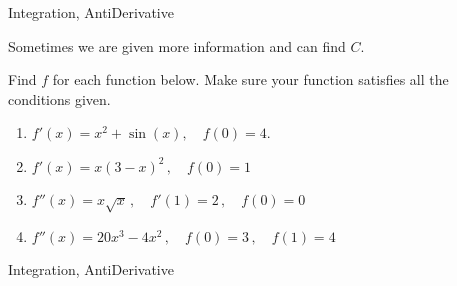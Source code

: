 
\begin{tagblock}{Integration, AntiDerivative}
\begin{question}

Sometimes we are given more information and can find $C$.  

\bigskip

Find $f$ for each function below. Make sure your function satisfies all the conditions given.
\begin{enumerate}
\item $f'(x) = x^2 + \sin(x), \quad f(0)=4$.
\vspace{1.5in}

\item $\displaystyle{f'(x)=x (3-x)^2\,,\quad f(0)=1}$
\vspace{1.8in}
\item $\displaystyle{f''(x)=x \sqrt{x}\,,\quad f'(1)=2\,,\quad f(0)=0}$
\vspace{1.8in}
\item $\displaystyle{f''(x)=20x^3-4x^2\,,\quad f(0)=3\,,\quad f(1)=4}$

\end{enumerate}
	
	
\begin{tags}
	    Integration, AntiDerivative
\end{tags}
	
\begin{diary}
	   
\end{diary}
	
\begin{solution}
	   
	    \end{enumerate}
\end{solution}
	
\end{question}

\end{tagblock}




